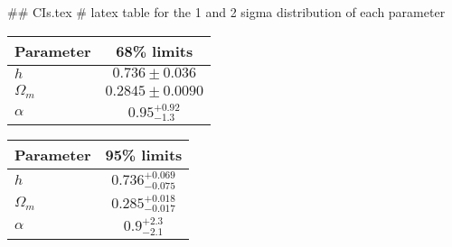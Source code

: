 ## CIs.tex
# latex table for the 1 and 2 sigma distribution of each parameter

\begin{tabular} { l  c}
 Parameter &  68\% limits\\
\hline
{\boldmath$h              $} & $0.736\pm 0.036            $\\
{\boldmath$\Omega_m       $} & $0.2845\pm 0.0090          $\\
{\boldmath$\alpha         $} & $0.95^{+0.92}_{-1.3}       $\\
\hline
\end{tabular}

\begin{tabular} { l  c}
 Parameter &  95\% limits\\
\hline
{\boldmath$h              $} & $0.736^{+0.069}_{-0.075}   $\\
{\boldmath$\Omega_m       $} & $0.285^{+0.018}_{-0.017}   $\\
{\boldmath$\alpha         $} & $0.9^{+2.3}_{-2.1}         $\\
\hline
\end{tabular}
